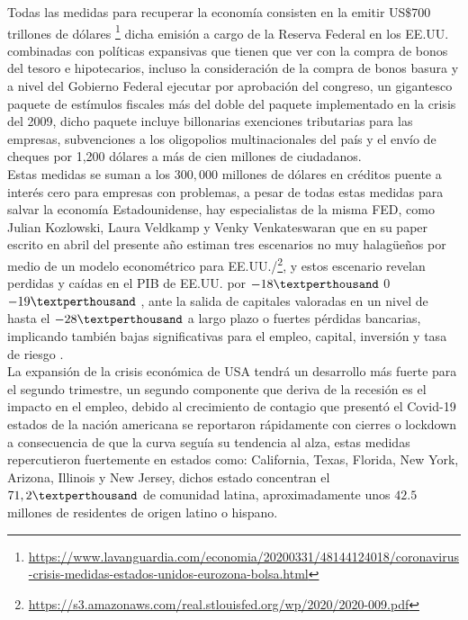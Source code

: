Todas las medidas para recuperar la economía consisten en la emitir US$\$$700 trillones de dólares \footnote{\href{https://www.lavanguardia.com/economia/20200331/48144124018/coronavirus-crisis-medidas-estados-unidos-eurozona-bolsa.html}{https://www.lavanguardia.com/economia/20200331/48144124018/coronavirus-crisis-medidas-estados-unidos-eurozona-bolsa.html}}  dicha emisión a cargo de la Reserva Federal en los EE.UU. combinadas con políticas expansivas que tienen que ver con la compra de bonos del tesoro e hipotecarios, incluso la consideración de la compra de bonos basura y a nivel del Gobierno Federal ejecutar por aprobación del congreso, un gigantesco paquete de estímulos fiscales más del doble del paquete implementado en la crisis del 2009, dicho paquete incluye billonarias exenciones tributarias para las empresas, subvenciones a los oligopolios multinacionales del país y el envío de cheques por 1,200 dólares a más de cien millones de ciudadanos.\\
 

Estas medidas se suman a los $300,000$ millones de dólares en créditos puente a interés cero para empresas con problemas, a pesar de todas estas medidas para salvar la economía Estadounidense, hay especialistas de la misma FED, como Julian Kozlowski, Laura Veldkamp y Venky Venkateswaran que en su paper escrito en abril del presente año estiman tres escenarios no muy halagüeños por medio de un modelo econométrico para EE.UU./\footnote{\href{https://s3.amazonaws.com/real.stlouisfed.org/wp/2020/2020-009.pdf}{https://s3.amazonaws.com/real.stlouisfed.org/wp/2020/2020-009.pdf}}, y estos escenario revelan perdidas y caídas en el PIB de EE.UU. por $-18 \textperthousand$ 0 $-19 \textperthousand$ , ante la salida de capitales valoradas en un nivel de hasta el $-28 \textperthousand$ a largo plazo o fuertes pérdidas bancarias, implicando también bajas significativas para el empleo, capital, inversión y tasa de riesgo .\\

La expansión de la crisis económica de USA tendrá un desarrollo más fuerte para el segundo trimestre, un segundo componente que deriva de la recesión es el impacto en el empleo, debido al crecimiento de contagio que presentó el Covid-19 estados de la nación americana se reportaron rápidamente con cierres o lockdown a consecuencia de que la curva seguía su tendencia al alza, estas medidas repercutieron fuertemente en estados como: California, Texas, Florida, New York, Arizona, Illinois y New Jersey, dichos estado concentran el $71,2 \textperthousand$ de comunidad latina, aproximadamente unos $42.5$ millones de residentes de origen latino o hispano.\\

